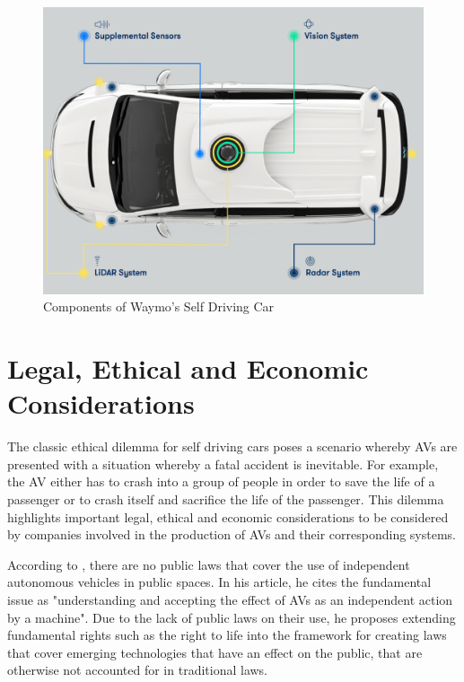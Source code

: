 \begin{figure}[t]
	\centering
	\includegraphics[width=\textwidth]{media/waymo.png}
	\caption{Components of Waymo's Self Driving Car \cite{waymo_2018}}
	\label{fig:my_label}
\end{figure}



\section{Legal, Ethical and Economic Considerations}

The classic ethical dilemma for self driving cars poses a scenario whereby AVs are presented with a situation whereby a fatal accident is inevitable. For example, the AV either has to crash into a group of people in order to save the life of a passenger or to crash itself and sacrifice the life of the passenger. This dilemma highlights important legal, ethical and economic considerations to be considered by companies involved in the production of AVs and their corresponding systems. 


According to \cite{gasser2016fundamental}, there are no public laws that cover the  use of independent autonomous vehicles in public spaces. In his article, he cites the fundamental issue as "understanding and accepting the effect of AVs as an independent action by a machine". Due to the lack of public laws on their use, he proposes extending fundamental rights such as the right to life into the framework for creating laws that cover emerging technologies that have an effect on the public, that are otherwise not accounted for in traditional laws. 

